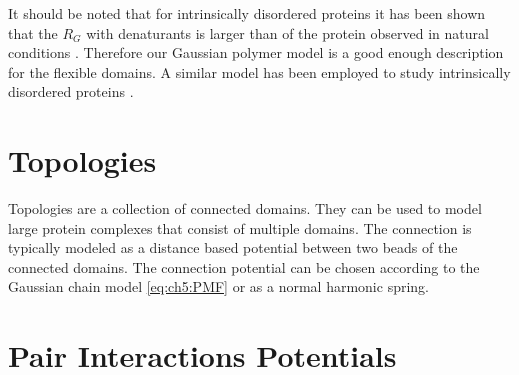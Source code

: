 \documentclass[12pt, twoside]{report}
\begin{document}
It should be noted that for intrinsically disordered proteins it has been shown
that the \(R_G\) with denaturants is larger than of the protein observed in
natural conditions \cite{Fuertes2017, Song2017, Zheng2016, Borgia2016}.
Therefore our Gaussian polymer model is a good enough description for the
flexible domains. A similar model has been employed to study intrinsically
disordered proteins \cite{Dignon2018a}.

\chapter{Topologies}

Topologies are a collection of connected domains. They can be used to model
large protein complexes that consist of multiple domains. The connection is
typically modeled as a distance based potential between two beads of the
connected domains. The connection potential can be chosen according to the
Gaussian chain model \cref{eq:ch5:PMF} or as a normal harmonic spring.


\chapter{Pair Interactions Potentials}
\end{document}
